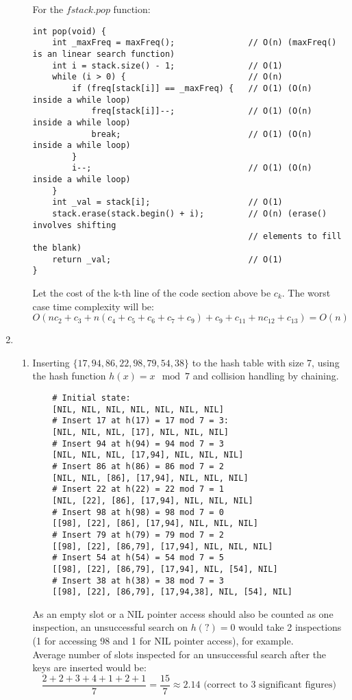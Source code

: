 \documentclass{article}
\begin{document}
\begin{enumerate}
\begin{enumerate}[label=(\alph*)]
        For the $fstack.pop$ function:
        \begin{verbatim}
int pop(void) {
    int _maxFreq = maxFreq();               // O(n) (maxFreq() is an linear search function)
    int i = stack.size() - 1;               // O(1)
    while (i > 0) {                         // O(n)
        if (freq[stack[i]] == _maxFreq) {   // O(1) (O(n) inside a while loop)
            freq[stack[i]]--;               // O(1) (O(n) inside a while loop)
            break;                          // O(1) (O(n) inside a while loop)
        }
        i--;                                // O(1) (O(n) inside a while loop)
    }
    int _val = stack[i];                    // O(1)
    stack.erase(stack.begin() + i);         // O(n) (erase() involves shifting
                                            // elements to fill the blank)
    return _val;                            // O(1)
}
        \end{verbatim}
        Let the cost of the k-th line of the code section above be $c_k$. The worst case time complexity will be:
        \[
        O(nc_2+c_3+n(c_4+c_5+c_6+c_7+c_9)+c_9+c_{11}+nc_{12}+c_{13}) = O(n)
        \]
    \end{enumerate}

\item
    \begin{enumerate}[label=(\alph*)]
        \item Inserting $\{17,94,86,22,98,79,54,38\}$ to the hash table with size 7, using the hash function $h(x) = x \mod 7$ and collision handling by chaining.
        \begin{verbatim}
    # Initial state:
    [NIL, NIL, NIL, NIL, NIL, NIL, NIL]
    # Insert 17 at h(17) = 17 mod 7 = 3:
    [NIL, NIL, NIL, [17], NIL, NIL, NIL]
    # Insert 94 at h(94) = 94 mod 7 = 3
    [NIL, NIL, NIL, [17,94], NIL, NIL, NIL]
    # Insert 86 at h(86) = 86 mod 7 = 2
    [NIL, NIL, [86], [17,94], NIL, NIL, NIL]
    # Insert 22 at h(22) = 22 mod 7 = 1
    [NIL, [22], [86], [17,94], NIL, NIL, NIL]
    # Insert 98 at h(98) = 98 mod 7 = 0
    [[98], [22], [86], [17,94], NIL, NIL, NIL]
    # Insert 79 at h(79) = 79 mod 7 = 2
    [[98], [22], [86,79], [17,94], NIL, NIL, NIL]
    # Insert 54 at h(54) = 54 mod 7 = 5
    [[98], [22], [86,79], [17,94], NIL, [54], NIL]
    # Insert 38 at h(38) = 38 mod 7 = 3
    [[98], [22], [86,79], [17,94,38], NIL, [54], NIL]
        \end{verbatim}
        As an empty slot or a NIL pointer access should also be counted as one inspection, an unsuccessful search on $h(?) = 0$ would take 2 inspections (1 for accessing 98 and 1 for NIL pointer access), for example. \\
        Average number of slots inspected for an unsuccessful search after the keys are inserted would be:
        \[
        \frac{2+2+3+4+1+2+1}{7} = \frac{15}{7} \approx 2.14 \text{ (correct to 3 significant figures)}
        \]


\end{enumerate}
\end{enumerate}
\end{document}
